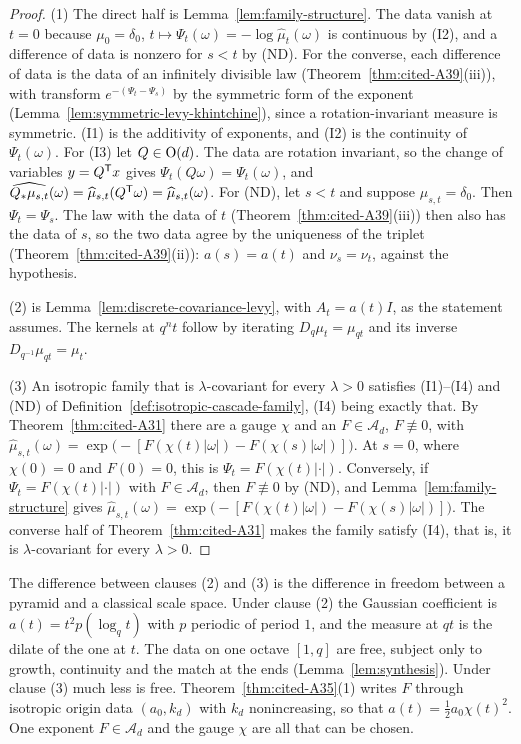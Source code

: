 \begin{proof}
(1) The direct half is Lemma~\ref{lem:family-structure}. The data vanish at $t = 0$ because
$\mu_0 = \delta_0$, $t \mapsto \Psi_t(\omega) = -\log\widehat\mu_t(\omega)$ is continuous by (I2),
and a difference of data is nonzero for $s < t$ by (ND). For the converse, each difference of data is
the data of an infinitely divisible law (Theorem~\ref{thm:cited-A39}(iii)), with transform
$e^{-(\Psi_t - \Psi_s)}$ by the symmetric form of the exponent (Lemma~\ref{lem:symmetric-levy-khintchine}), since a rotation-invariant measure is symmetric. (I1) is the
additivity of exponents, and (I2) is the continuity of $\Psi_t(\omega)$. For (I3) let
$Q \in \mathrm{O}(d)$. The data are rotation invariant, so the change of variables $y = Q^{\mathsf{T}}x$ gives
$\Psi_t(Q\omega) = \Psi_t(\omega)$, and $\widehat{Q_*\mu_{s,t}}(\omega) = \widehat\mu_{s,t}(Q^{\mathsf{T}}\omega)
= \widehat\mu_{s,t}(\omega)$. For (ND), let $s < t$ and suppose $\mu_{s,t} = \delta_0$. Then
$\Psi_t = \Psi_s$. The law with the data of $t$ (Theorem~\ref{thm:cited-A39}(iii)) then
also has the data of $s$, so the two data agree by the uniqueness of the triplet
(Theorem~\ref{thm:cited-A39}(ii)): $a(s) = a(t)$ and $\nu_s = \nu_t$, against the
hypothesis.

(2) is Lemma~\ref{lem:discrete-covariance-levy}, with $A_t = a(t)I$, as the statement assumes. The kernels at $q^nt$ follow by iterating $D_q\mu_t = \mu_{qt}$ and
its inverse $D_{q^{-1}}\mu_{qt} = \mu_t$.

(3) An isotropic family that is $\lambda$-covariant for every $\lambda > 0$ satisfies (I1)--(I4) and
(ND) of Definition~\ref{def:isotropic-cascade-family}, (I4) being exactly that. By
Theorem~\ref{thm:cited-A31} there are a gauge $\chi$ and an $F \in \mathcal{A}_d$,
$F \not\equiv 0$, with
$\widehat\mu_{s,t}(\omega) = \exp\bigl(-[F(\chi(t)|\omega|) - F(\chi(s)|\omega|)]\bigr)$. At $s = 0$,
where $\chi(0) = 0$ and $F(0) = 0$, this is $\Psi_t = F(\chi(t)|\cdot|)$. Conversely, if
$\Psi_t = F(\chi(t)|\cdot|)$ with $F \in \mathcal{A}_d$, then $F \not\equiv 0$ by (ND), and
Lemma~\ref{lem:family-structure} gives
$\widehat\mu_{s,t}(\omega) = \exp\bigl(-[F(\chi(t)|\omega|) - F(\chi(s)|\omega|)]\bigr)$. The converse
half of Theorem~\ref{thm:cited-A31} makes the family satisfy (I4), that is, it is
$\lambda$-covariant for every $\lambda > 0$.
\end{proof}

The difference between clauses (2) and (3) is the difference in freedom between a pyramid and a
classical scale space. Under clause (2) the Gaussian coefficient is $a(t) = t^2p(\log_qt)$ with $p$
periodic of period $1$, and the \Levy{} measure at $qt$ is the dilate of the one at $t$. The data
on one octave $[1, q]$ are free, subject only to growth, continuity and the match at the ends
(Lemma~\ref{lem:synthesis}). Under clause (3) much less is free. Theorem~\ref{thm:cited-A35}(1)
writes $F$ through isotropic origin data $(a_0, k_d)$ with $k_d$ nonincreasing, so that
$a(t) = \tfrac12a_0\chi(t)^2$. One exponent $F \in \mathcal{A}_d$ and the gauge $\chi$ are all
that can be chosen.

